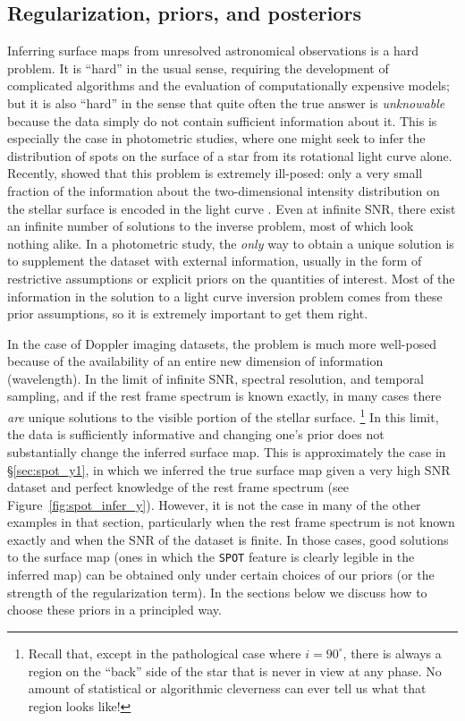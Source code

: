 \documentclass[modern]{aastex631}
\begin{document}
\subsection{Regularization, priors, and posteriors}
\label{sec:discussion:priors}
%
%
Inferring surface maps from unresolved astronomical observations is a hard problem.
It is ``hard'' in the usual sense, requiring the development of complicated algorithms and the evaluation of computationally expensive models; but it is also ``hard'' in the sense that quite often the true answer is \emph{unknowable} because the data simply do not contain sufficient information about it.
This is especially the case in photometric studies, where one might seek to infer the distribution of spots on the surface of a star from its rotational light curve alone.
Recently, \citet{Luger2021a} showed that this problem is extremely ill-posed: only a very small fraction of the information about the two-dimensional intensity distribution on the stellar surface is encoded in the light curve \citep[see also][]{Basri2020}.
Even at infinite SNR, there exist an infinite number of solutions to the inverse problem, most of which look nothing alike.
In a photometric study, the \emph{only} way to obtain a unique solution is to supplement the dataset with external information, usually in the form of restrictive assumptions or explicit priors on the quantities of interest.
Most of the information in the solution to a light curve inversion problem comes from these prior assumptions, so it is extremely important to get them right.

In the case of Doppler imaging datasets, the problem is much more well-posed because of the availability of an entire new dimension of information (wavelength). 
In the limit of infinite SNR, spectral resolution, and temporal sampling, and if the rest frame spectrum is known exactly, in many cases there \emph{are} unique solutions to the visible portion of the stellar surface.%
\footnote{
    Recall that, except in the pathological case where $i = 90^\circ$, there is always a region on the ``back'' side of the star that is never in view at any phase. 
    No amount of statistical or algorithmic cleverness can ever tell us what that region looks like!%
}
In this limit, the data is sufficiently informative and changing one's prior does not substantially change the inferred surface map.
This is approximately the case in \S\ref{sec:spot_y1}, in which we inferred the true surface map given a very high SNR dataset and perfect knowledge of the rest frame spectrum (see Figure~\ref{fig:spot_infer_y}).
However, it is not the case in many of the other examples in that section, particularly when the rest frame spectrum is not known exactly and when the SNR of the dataset is finite.
In those cases, good solutions to the surface map (ones in which the \texttt{SPOT} feature is clearly legible in the inferred map) can be obtained only under certain choices of our priors (or the strength of the regularization term). 
In the sections below we discuss how to choose these priors in a principled way.
\end{document}
